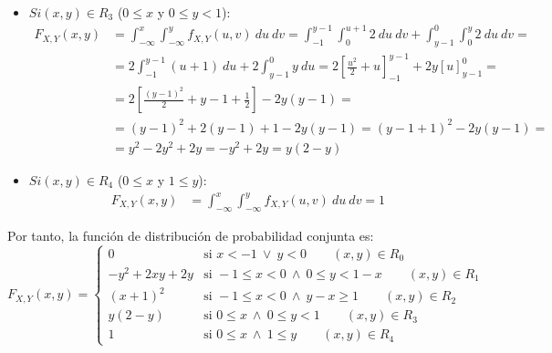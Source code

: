 \documentclass[12pt]{article}
\begin{document}
\begin{ejercicio}[5 puntos]
\begin{enumerate}
\begin{itemize}
                \item \ul{$Si (x,y)\in R_3$} ($0\leq x$ y $0\leq y<1$):
                \begin{align*}
                    F_{X,Y}(x,y) &= \int_{-\infty}^{x}\int_{-\infty}^{y} f_{X,Y}(u,v) \ du \ dv
                    = \int_{-1}^{y-1}\int_{0}^{u+1} 2 \ du \ dv
                    + \int_{y-1}^{0}\int_{0}^{y} 2 \ du \ dv
                    =\\&= 2\int_{-1}^{y-1} (u+1) \ du + 2\int_{y-1}^{0} y \ du
                    = 2\left[\frac{u^2}{2}+u\right]_{-1}^{y-1} + 2y\left[u\right]_{y-1}^{0}
                    =\\&= 2\left[\frac{(y-1)^2}{2} + y-1+\frac{1}{2}\right] - 2y(y-1)
                    =\\&= (y-1)^2 + 2(y-1)+1 - 2y(y-1)
                    = (y-1+1)^2 - 2y(y-1)
                    =\\&= y^2 - 2y^2 + 2y = -y^2 + 2y = y(2-y)
                \end{align*}

                \item \ul{$Si (x,y)\in R_4$} ($0\leq x$ y $1\leq y$):
                \begin{align*}
                    F_{X,Y}(x,y) &= \int_{-\infty}^{x}\int_{-\infty}^{y} f_{X,Y}(u,v) \ du \ dv
                    = 1
                \end{align*}
            \end{itemize}

            Por tanto, la función de distribución de probabilidad conjunta es:
            \begin{equation*}
                F_{X,Y}(x,y) = \begin{cases}
                    0 & \text{si } x<-1 \ \lor \ y<0 \qquad (x,y)\in R_0 \\
                    -y^2 + 2xy + 2y & \text{si } -1\leq x<0 \ \land \ 0\leq y<1-x \qquad (x,y)\in R_1 \\
                    (x+1)^2 & \text{si } -1\leq x<0 \ \land \ y-x\geq 1 \qquad (x,y)\in R_2 \\
                    y(2-y) & \text{si } 0\leq x \ \land \ 0\leq y<1 \qquad (x,y)\in R_3 \\
                    1 & \text{si } 0\leq x \ \land \ 1\leq y \qquad (x,y)\in R_4
                \end{cases}
            \end{equation*}



\end{enumerate}
\end{ejercicio}
\end{document}
